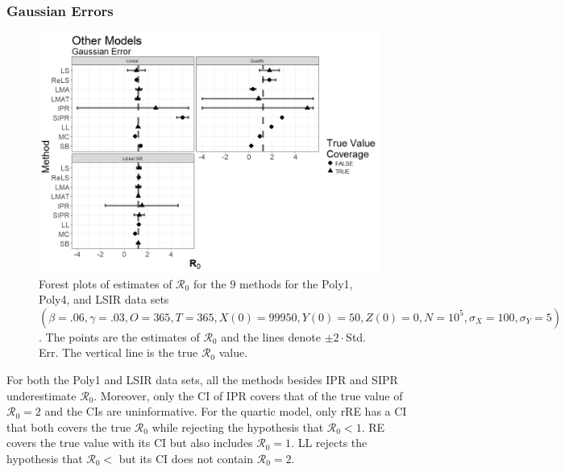 \documentclass[12pt]{article}
\newcommand{\xxsir}{\ensuremath{9} } %
\newcommand{\rr}{\ensuremath{\mathcal{R}_0}}
\begin{document}
\subsubsection{Gaussian Errors}

\begin{figure}[H]
  \begin{center}
    \includegraphics[scale=0.5]{images/other_n.jpeg}
  \caption{Forest plots of estimates of $\rr$ for the \xxsir methods for the Poly1, Poly4, and LSIR data sets $(\beta=.06, \gamma=.03, O=365, T=365, X(0)=99950, Y(0)=50, Z(0)=0, N=10^5, \sigma_X=100, \sigma_Y=5)$.  The points are the estimates of $\rr$ and the lines denote $\pm 2\cdot $Std. Err.  The vertical line is the true $\rr$ value.}
  \label{fig:other-res}	
  \end{center}
\end{figure}

For both the Poly1 and LSIR data sets, all the methods besides IPR and SIPR underestimate $\rr$.  Moreover, only the CI of IPR covers that of the true value of $\rr=2$ and the CIs are uninformative.  For the quartic model, only rRE has a CI that both covers the true $\rr$ while rejecting the hypothesis that $\rr < 1$.  RE covers the true value with its CI but also includes $\rr=1$.  LL rejects the hypothesis that $\rr <$ but its CI does not contain $\rr=2$.
\end{document}
